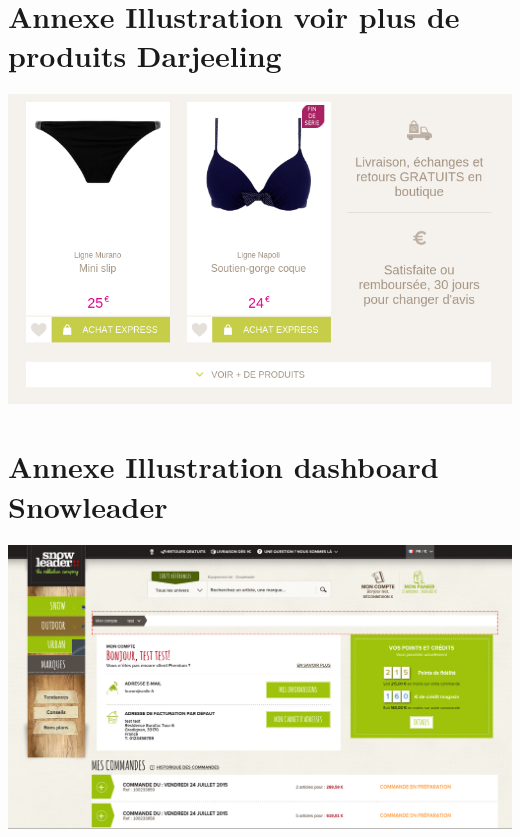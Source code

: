\documentclass[a4paper,11pt,twoside]{report}
\begin{document}
  \section*{Annexe Illustration voir plus de produits Darjeeling}
  \begin{center}
      \includegraphics[width=\textwidth]{images/darjeeling_see_more_products.png} 
      \label{darjeeling_see_more_products}
  \end{center}
  
  \newpage
  
  \section*{Annexe Illustration dashboard Snowleader}
  \begin{center}
      \includegraphics[width=\textwidth]{images/SL_dashboard_customer.png} 
      \label{SL_dashboard_customer}
  \end{center}
  
\end{document}
